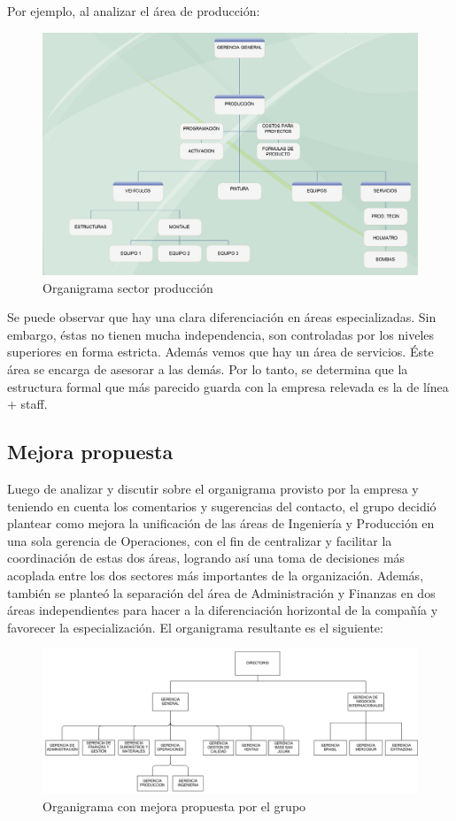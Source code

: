 \documentclass[a4paper,10pt]{article}
\begin{document}
Por ejemplo, al analizar el área de producción:
	\begin{figure}[H]
		\centering
		\includegraphics[width=15cm]{imagenes/produccion.png}
		\caption{Organigrama sector producción}
	\end{figure}
Se puede observar que hay una clara diferenciación en áreas especializadas. Sin embargo, éstas no tienen mucha independencia, son controladas
por los niveles superiores en forma estricta. Además vemos que hay un área de servicios. Éste área se encarga de asesorar a las demás. Por lo tanto,
se determina que la estructura formal que más parecido guarda con la empresa relevada es la de línea + staff.
	
\subsection{Mejora propuesta}
	Luego de analizar y discutir sobre el organigrama provisto por la empresa y teniendo en cuenta los comentarios y sugerencias del contacto, el grupo decidió plantear como mejora la unificación de las áreas de Ingeniería y Producción en una sola gerencia de Operaciones, con el fin de centralizar y facilitar la coordinación de estas dos áreas, logrando así una toma de decisiones más acoplada entre los dos sectores más importantes de la organización. Además, también se planteó la separación del área de Administración y Finanzas en dos áreas independientes para hacer a la diferenciación horizontal  de la compañía y favorecer la especialización. El organigrama resultante es el siguiente:
	\begin{figure}[H]
		\centering
		\includegraphics[width=15cm]{imagenes/mejoraOrganigrama.png}
		\caption{Organigrama con mejora propuesta por el grupo}
	\end{figure}
\end{document}
